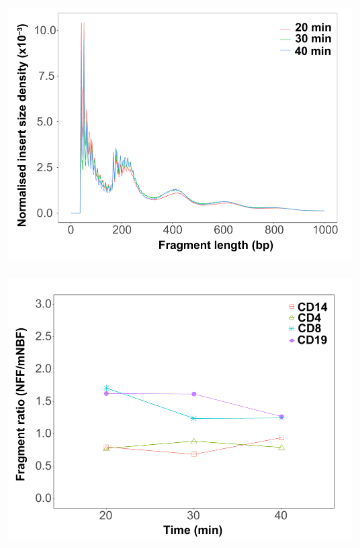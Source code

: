 \begin{figure}[ht]
\centering
\begin{subfigure}{0.5\textwidth}
\centering
\includegraphics[width=\textwidth]{./Results1/pdfs/ATAC_CD8_fragment_size_distribution_20_30_40min}
\caption{\textbf{}}
\end{subfigure}%
\begin{subfigure}{0.5\textwidth}
\centering
\includegraphics[width=\textwidth]{./Results1/pdfs/ATAC_ratio_short_long_fragments_mononucleosomes_20_30_40_min}
\caption{\textbf{}}
\end{subfigure} \\
\begin{subfigure}{0.5\textwidth}

\end{subfigure}
\end{figure}
